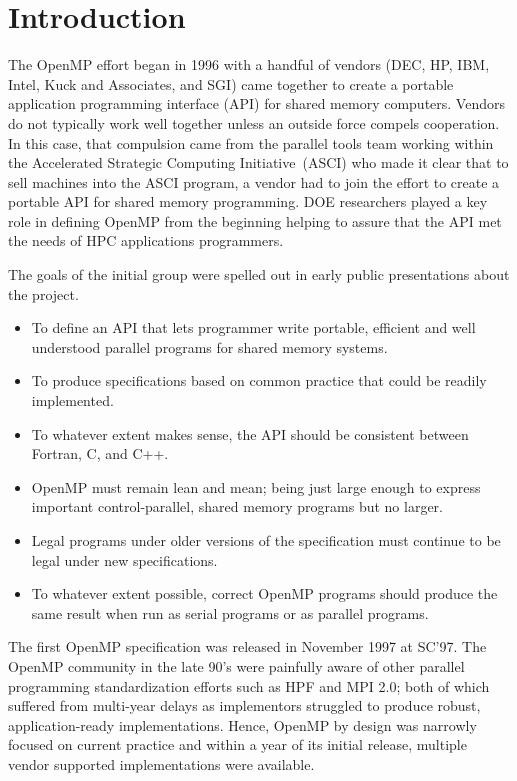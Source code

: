 \section{Introduction}
\label{sec:intro}

The OpenMP effort began in 1996 with a handful of vendors (DEC, HP, IBM, Intel,
Kuck and Associates, and SGI) came together to create a portable application
programming interface (API) for shared memory computers.  Vendors do not
typically work well together unless an outside force compels cooperation.  In
this case, that compulsion came from the parallel tools team working within the
Accelerated Strategic Computing Initiative~(ASCI) who made it clear that to sell
machines into the ASCI program, a vendor had to join the effort to create a
portable API for shared memory programming.  DOE researchers played a key role
in defining OpenMP from the beginning helping to assure that the API met the
needs of HPC applications programmers.

The goals of the initial group were spelled out in early public presentations
about the project\cite{ewomp99}.

\begin{itemize}
  \item To define an API that lets programmer write portable, efficient and well
    understood parallel programs for shared memory systems.
  \item To produce specifications based on common practice that could be readily implemented.
  \item To whatever extent makes sense, the API should be consistent between Fortran, C,
    and C++.
  \item OpenMP must remain lean and mean; being just large enough to express important
    control-parallel, shared memory programs  but no larger.
  \item Legal programs under older versions of the specification must continue to be legal
    under new specifications.
  \item To whatever extent possible, correct OpenMP programs should produce the same result
    when run as serial programs or as parallel programs.
\end{itemize}

The first OpenMP specification  was released in November 1997 at SC'97.   The
OpenMP community in the late 90's were painfully aware of other parallel
programming  standardization efforts such as HPF and MPI 2.0; both of which
suffered from multi-year delays as implementors struggled to produce robust,
application-ready implementations.  Hence, OpenMP by design was narrowly
focused on current practice and within a year of its initial release, multiple
vendor supported implementations were available.

